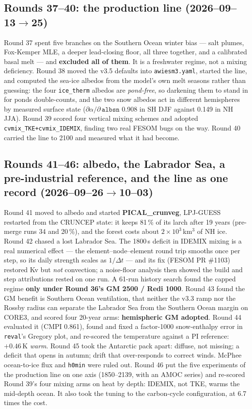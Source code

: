 \documentclass[10pt]{article}
\begin{document}
\subsection{Rounds 37--40: the production line (2026--09--13$\to$25)}

Round 37 spent five branches on the Southern Ocean winter bias --- salt plumes, Fox-Kemper
MLE, a deeper lead-closing floor, all three together, and a calibrated basal melt --- and
\textbf{excluded all of them}. It is a freshwater regime, not a mixing deficiency. Round 38
moved the v3.5 defaults into \texttt{awiesm3.yaml}, started the line, and computed the
sea-ice albedos from the model's own melt seasons rather than guessing: the four
\texttt{ice\_therm} albedos are \emph{pond-free}, so darkening them to stand in for ponds
double-counts, and the two snow albedos act in different hemispheres by measured surface
state ($\partial\alpha/\partial\,\texttt{albsn}$ 0.908 in SH DJF against 0.149 in NH JJA).
Round 39 scored four vertical mixing schemes and adopted \texttt{cvmix\_TKE+cvmix\_IDEMIX},
finding two real FESOM bugs on the way. Round 40 carried the line to 2100 and measured what
it had become.

\subsection{Rounds 41--46: albedo, the Labrador Sea, a pre-industrial reference, and the line as one record
(2026--09--26$\to$10--03)}

Round 41 moved to albedo and started \textbf{PICAL\_crunveg}, LPJ-GUESS restarted from the
CRUNCEP state: it keeps 81\,\% of its larch after 19 years (pre-merge runs 34 and 20\,\%), and
the forest costs about $2\times10^3$\,km$^3$ of NH ice. Round 42 chased a lost Labrador Sea.
The 1800\,s deficit in IDEMIX mixing is a real numerical effect --- the element--node--element
round trip smooths once per step, so its daily strength scales as $1/\Delta t$ --- and its fix
(FESOM PR \#1103) restored Kv but \emph{not} convection; a noise-floor analysis then showed the
build and step attributions rested on one run. A 61-run history search found the capped regime
\textbf{only under Round 36's GM 2500 / Redi 1000}. Round 43 found the GM benefit is Southern
Ocean ventilation, that neither the v3.3 ramp nor the Rossby radius can separate the Labrador Sea
from the Southern Ocean margin on CORE3, and scored four 20-year arms: \textbf{hemispheric GM
adopted}. Round 44 evaluated it (CMPI 0.861), found and fixed a factor-1000 snow-enthalpy error in
\texttt{reval}'s Gregory plot, and re-scored the temperature against a PI reference: $+0.46$\,K
\emph{warm}. Round 45 took the Antarctic pack apart: diffuse, not missing; a deficit that opens in
autumn; drift that over-responds to correct winds. McPhee ocean-to-ice flux and \texttt{h0min} were
ruled out. Round 46 put the five experiments of the production line on one axis (1850--2139, with an
AMOC series) and re-scored Round 39's four mixing arms on heat by depth: IDEMIX, not TKE, warms the
mid-depth ocean. It also took the tuning to the carbon-cycle configuration, at 6.7 times the cost.
\end{document}
